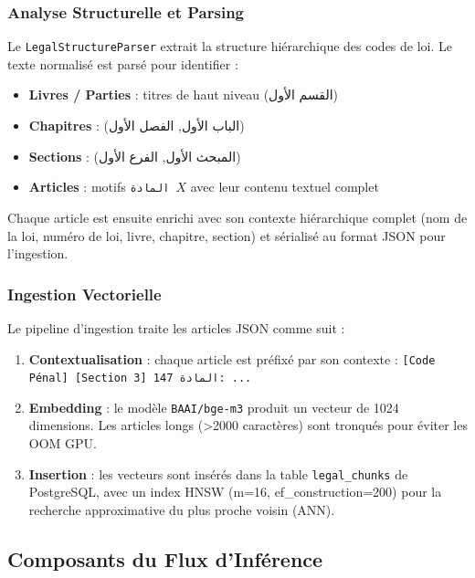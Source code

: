 \subsubsection{Analyse Structurelle et Parsing}

Le \texttt{LegalStructureParser} \cite{src:structure} extrait la structure
hiérarchique des codes de loi. Le texte normalisé est parsé pour identifier :

\begin{itemize}
    \item \textbf{Livres / Parties} : titres de haut niveau (\textarabic{القسم الأول})
    \item \textbf{Chapitres} : (\textarabic{الباب الأول}, \textarabic{الفصل الأول})
    \item \textbf{Sections} : (\textarabic{المبحث الأول}, \textarabic{الفرع الأول})
    \item \textbf{Articles} : motifs \texttt{المادة $X$} avec leur
    contenu textuel complet
\end{itemize}

Chaque article est ensuite enrichi avec son contexte hiérarchique complet
(nom de la loi, numéro de loi, livre, chapitre, section) et sérialisé au
format JSON pour l'ingestion.

\subsubsection{Ingestion Vectorielle}

Le pipeline d'ingestion \cite{src:ingestion} traite les articles JSON comme
suit :

\begin{enumerate}
    \item \textbf{Contextualisation} : chaque article est préfixé par son
    contexte : \texttt{[Code P\'enal] [Section 3] \textarabic{المادة 147:} ...}
    \item \textbf{Embedding} : le modèle \texttt{BAAI/bge-m3} produit un
    vecteur de 1024 dimensions. Les articles longs (>2000 caractères) sont
    tronqués pour éviter les OOM GPU.
    \item \textbf{Insertion} : les vecteurs sont insérés dans la table
    \texttt{legal\_chunks} de PostgreSQL, avec un index HNSW (m=16,
    ef\_construction=200) pour la recherche approximative du plus proche
    voisin (ANN).
\end{enumerate}

\subsection{Composants du Flux d'Inférence}

